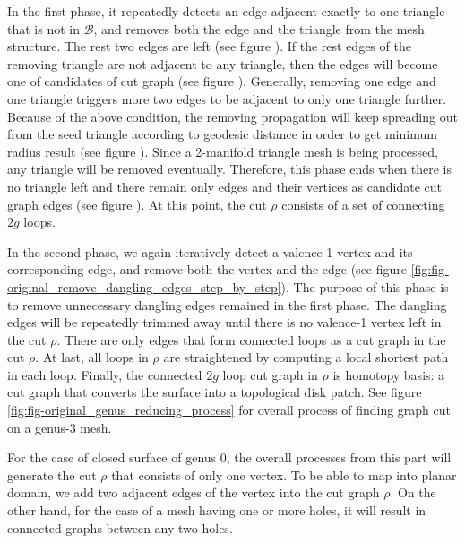 \documentclass[a4paper,twoside]{article}
\begin{document}
In the first phase, it repeatedly detects an edge adjacent exactly to one triangle that is not in $\mathscr{B}$, and removes both the edge and the triangle from the mesh structure. The rest two edges are left (see figure ). If the rest edges of the removing triangle are not adjacent to any triangle, then the edges will become one of candidates of cut graph (see figure ). Generally, removing one edge and one triangle triggers more two edges to be adjacent to only one triangle further. Because of the above condition, the removing propagation will keep spreading out from the seed triangle according to geodesic distance in order to get minimum radius result (see figure ). Since a 2-manifold triangle mesh is being processed, any triangle will be removed eventually. Therefore, this phase ends when there is no triangle left and there remain only edges and their vertices as candidate cut graph edges (see figure ). At this point, the cut $\rho$ consists of a set of connecting $2g$ loops.

In the second phase, we again iteratively detect a valence-1 vertex and its corresponding edge, and remove both the vertex and the edge (see figure \ref{fig:fig-original_remove_dangling_edges_step_by_step}). The purpose of this phase is to remove unnecessary dangling edges remained in the first phase. The dangling edges will be repeatedly trimmed away until there is no valence-1 vertex left in the cut $\rho$. There are only edges that form connected loops as a cut graph in the cut $\rho$. At last, all loops in $\rho$ are straightened by computing a local shortest path in each loop. Finally, the connected $2g$ loop cut graph in $\rho$ is homotopy basis: a cut graph that converts the surface into a topological disk patch. See figure \ref{fig:fig-original_genus_reducing_process} for overall process of finding graph cut on a genus-3 mesh.



For the case of closed surface of genus 0, the overall processes from this part will generate the cut $\rho$ that consists of only one vertex. To be able to map into planar domain, we add two adjacent edges of the vertex into the cut graph $\rho$. On the other hand, for the case of a mesh having one or more holes, it will result in connected graphs between any two holes.
\end{document}
